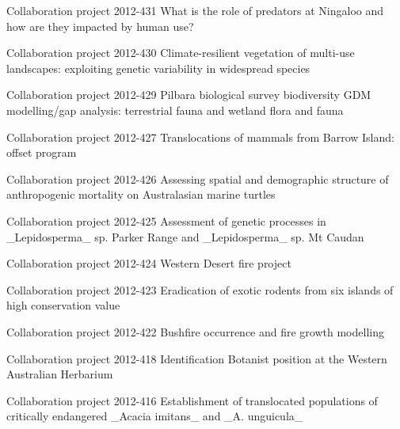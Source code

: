 \documentclass[version=last, paper=a4, DIV=18, usenames, dvipsnames]{scrartcl}
\begin{document}
\begin{longtabu}
  Collaboration project 2012-431 What is the role of predators at Ningaloo and how are they impacted by human use? \newline  \\ \hline

  Collaboration project 2012-430 Climate-resilient vegetation of multi-use landscapes: exploiting genetic variability in widespread species \newline  \\ \hline

  Collaboration project 2012-429 Pilbara biological survey biodiversity GDM modelling/gap analysis: terrestrial fauna and wetland flora and fauna \newline  \\ \hline

  Collaboration project 2012-427 Translocations of mammals from Barrow Island: offset program \newline  \\ \hline

  Collaboration project 2012-426 Assessing spatial and demographic structure of anthropogenic mortality on Australasian marine turtles \newline  \\ \hline

  Collaboration project 2012-425 Assessment of genetic processes in \_Lepidosperma\_ sp. Parker Range and \_Lepidosperma\_ sp. Mt Caudan \newline  \\ \hline

  Collaboration project 2012-424 Western Desert fire project \newline  \\ \hline

  Collaboration project 2012-423 Eradication of exotic rodents from six islands of high conservation value \newline  \\ \hline

  Collaboration project 2012-422 Bushfire occurrence and fire growth modelling \newline  \\ \hline

  Collaboration project 2012-418 Identification Botanist position at the Western Australian Herbarium \newline  \\ \hline

  Collaboration project 2012-416 Establishment of translocated populations of critically endangered \_Acacia imitans\_ and \_A. unguicula\_ \newline  \\ \hline


\end{longtabu}
\end{document}
